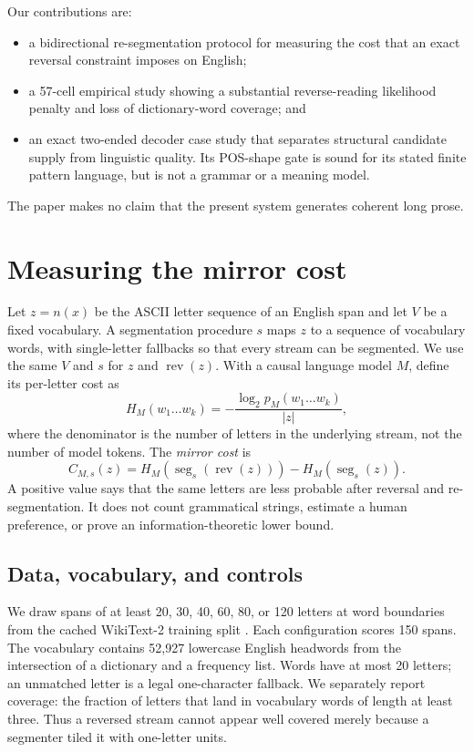 \documentclass[11pt]{article}
\newcommand{\norm}[1]{n(#1)}
\newcommand{\rev}{\operatorname{rev}}
\newcommand{\seg}{\operatorname{seg}}
\begin{document}
Our contributions are:
\begin{itemize}
\item a bidirectional re-segmentation protocol for measuring the cost that an
  exact reversal constraint imposes on English;
\item a 57-cell empirical study showing a substantial reverse-reading
  likelihood penalty and loss of dictionary-word coverage; and
\item an exact two-ended decoder case study that separates structural candidate
  supply from linguistic quality. Its POS-shape gate is sound for its stated
  finite pattern language, but is not a grammar or a meaning model.
\end{itemize}
The paper makes no claim that the present system generates coherent long prose.

\section{Measuring the mirror cost}
\label{sec:measure}

Let $z=\norm{x}$ be the ASCII letter sequence of an English span and let $V$
be a fixed vocabulary. A segmentation procedure $s$ maps $z$ to a sequence of
vocabulary words, with single-letter fallbacks so that every stream can be
segmented. We use the same $V$ and $s$ for $z$ and $\rev(z)$. With a causal
language model $M$, define its per-letter cost as
\begin{equation}
  H_M(w_1\ldots w_k) =
  -\frac{\log_2 p_M(w_1\ldots w_k)}{|z|},
\end{equation}
where the denominator is the number of letters in the underlying stream, not
the number of model tokens. The \emph{mirror cost} is
\begin{equation}
  C_{M,s}(z)=H_M(\seg_s(\rev(z))) - H_M(\seg_s(z)).
\end{equation}
A positive value says that the same letters are less probable after reversal
and re-segmentation. It does not count grammatical strings, estimate a human
preference, or prove an information-theoretic lower bound.

\subsection{Data, vocabulary, and controls}

We draw spans of at least 20, 30, 40, 60, 80, or 120 letters at word boundaries
from the cached WikiText-2 training split \citep{merity2016pointer}. Each
configuration scores 150 spans. The vocabulary contains 52,927 lowercase
English headwords from the intersection of a dictionary and a frequency list.
Words have at most 20 letters; an unmatched letter is a legal one-character
fallback. We separately report coverage: the fraction of letters that land in
vocabulary words of length at least three. Thus a reversed stream cannot
appear well covered merely because a segmenter tiled it with one-letter units.
\end{document}
